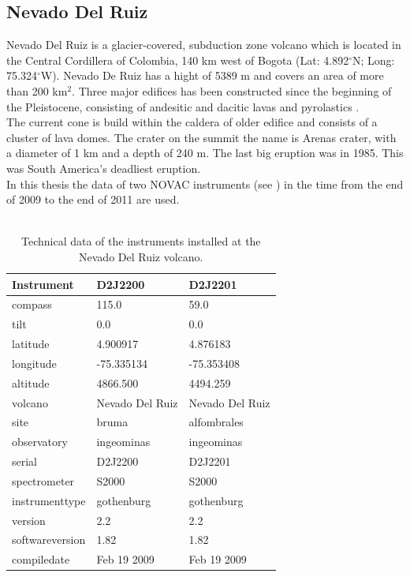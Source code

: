 \documentclass  [
  paper    = a4,
  BCOR     = 10mm,
  twoside,
  fontsize = 12pt,
  fleqn,
  toc      = bibnumbered,
  toc      = listofnumbered,
  numbers  = noendperiod,
  headings = normal,
  listof   = leveldown,
  version  = 3.03
]                                       {scrreprt}
\begin{document}
	\subsection*{Nevado Del Ruiz}
	Nevado Del Ruiz is a glacier-covered, subduction zone volcano which is located in the Central Cordillera of Colombia, 140 km west of Bogota
	(Lat: 4.892$^{\circ}$N; Long: 75.324$^{\circ}$W). Nevado De Ruiz has a hight of 5389 m and covers an area of more than 200 km$^2$.
	Three major edifices has been constructed since the beginning of the Pleistocene, consisting of andesitic and dacitic lavas and pyrolastics \citep{GlobalVolcanismProgram}. \\
	The current cone is build within the caldera of older edifice and consists of a cluster of lava domes. The crater on the summit the name is Arenas crater, with a diameter of 1 km and a depth of 240 m. 
	The last big eruption was in 1985. This was South America's deadliest eruption.\\
	In this thesis the data of two NOVAC instruments (see ) in the time from the end of 2009 to the end of 2011 are used. \\
	\\
	\begin{table}
		\centering
	\begin{tabular}{|p{4cm}|p{3cm}|p{3cm}|}
		Instrument	&D2J2200&D2J2201\\
		\toprule
		compass&115.0		&59.0		\\
		tilt&0.0		&0.0		\\
		latitude&4.900917		&4.876183		\\
		longitude&-75.335134		&-75.353408		\\
		altitude&4866.500		&4494.259		\\
		volcano&Nevado Del Ruiz		&Nevado Del Ruiz		\\
		site&bruma	&alfombrales\\
		observatory&ingeominas		&ingeominas		\\
		serial&D2J2200		&D2J2201		\\
		spectrometer&S2000		&S2000		\\	
		instrumenttype&gothenburg		&gothenburg		\\
		version&2.2		&2.2		\\
		softwareversion&1.82		&1.82		\\
		compiledate&Feb 19 2009		&Feb 19 2009		\\
		\bottomrule
	\end{tabular}
	\caption{Technical data of the instruments installed at the Nevado Del Ruiz volcano.}
	\label{tab:NVDRInstruments}
\end{table}
\end{document}
